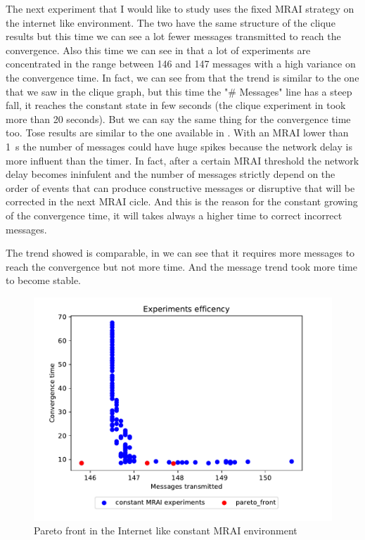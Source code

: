 \documentclass[10pt,conference,letterpaper]{IEEEtran}
\newcommand{\figwidth}{0.78}
\newcommand{\figvspace}{-1.5em}
\begin{document}
The next experiment that I would like to study uses the fixed \ac{MRAI} strategy
on the internet like environment.
The two  have the
same structure of the clique results but this time we can see a lot fewer messages
transmitted to reach the convergence.
Also this time we can see in  that a lot of
experiments are concentrated in the range between \num{146} and \num{147} messages
with a high variance on the convergence time.
In fact, we can see from  that the trend is similar
to the one that we saw in the clique graph, but this time the "\# Messages" line
has a steep fall, it reaches the constant state in few seconds (the clique experiment
in  took more than \num{20} seconds).
But we can say the same thing for the convergence time too.
Tose results are similar to the one available in \cite{griffin2001experimental}.
With an \ac{MRAI} lower than \SI{1}{\second} the number of messages could have huge
spikes because the network delay is more influent than the timer.
In fact, after a certain \ac{MRAI} threshold the network delay becomes ininfulent
and the number of messages strictly depend on the order of events that can 
produce constructive messages or disruptive that will be corrected in the next
\ac{MRAI} cicle.
And this is the reason for the constant growing of the convergence time,
it will takes always a higher time to correct incorrect messages.

The trend showed 
is comparable, in  we can see that
it requires more messages to reach the convergence but not more time.
And the message trend took more time to become stable.

\begin{figure}[tb]
	\centering
	\includegraphics[width=\figwidth\columnwidth]{images/internet_like/graph-100-constant/pareto-constant}
	\caption{Pareto front in the Internet like constant \ac{MRAI} environment}
	\label{fig:constant_mrai_pareto_freq}
	\vspace{\figvspace}
\end{figure}
\end{document}
